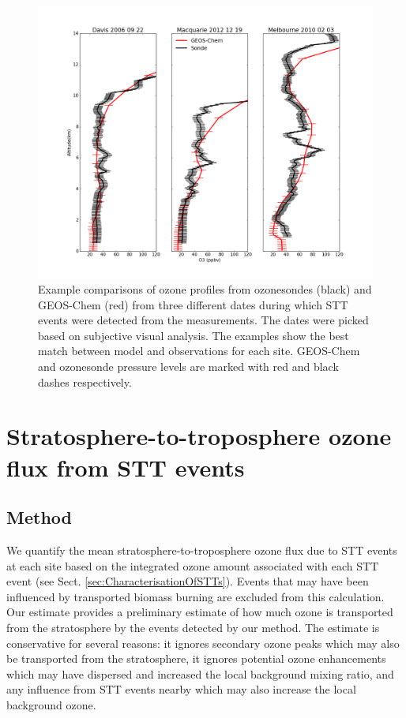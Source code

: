 \documentclass[acp, manuscript]{copernicus} %
\begin{document}
  \begin{figure}
    \includegraphics[width=12cm]{figures/event_profile_comparison.png}
    \caption{%
      Example comparisons of ozone profiles from ozonesondes (black) and GEOS-Chem (red) from three different dates during which STT events were detected from the measurements.
      The dates were picked based on subjective visual analysis. 
      The examples show the best match between model and observations for each site.
      GEOS-Chem and ozonesonde pressure levels are marked with red and black dashes respectively.}
    \label{fig:event_profile_comparison}
  \end{figure}

\section{Stratosphere-to-troposphere ozone flux from STT events}
  \label{sec:STTevents}
  \subsection{Method}
  \label{sec:fluxcalc}
    We quantify the mean stratosphere-to-troposphere ozone flux due to STT events at each site based on the integrated ozone amount associated with each STT event (see Sect. \ref{sec:CharacterisationOfSTTs}).
    Events that may have been influenced by transported biomass burning are excluded from this calculation.
    Our estimate provides a preliminary estimate of how much ozone is transported from the stratosphere by the events detected by our method.
    The estimate is conservative for several reasons: it ignores secondary ozone peaks which may also be transported from the stratosphere, it ignores potential ozone enhancements which may have dispersed and increased the local background mixing ratio, and any influence from STT events nearby which may also increase the local background ozone.
\end{document}
